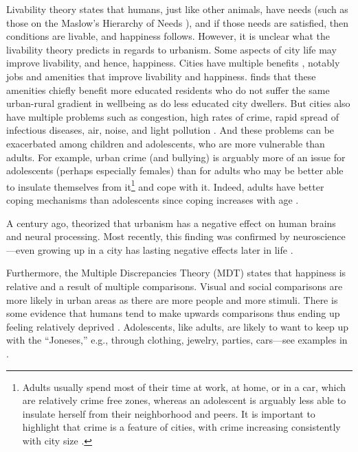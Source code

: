 \documentclass[10pt, letterpaper]{article}
\begin{document}
\begin{spacing}{1.4}
Livability theory \citep{veenhoven95,veenhoven14b,veenhoven00b} states that humans, just like other animals, have needs (such as those on the Maslow's Hierarchy of Needs \citep{maslow87}), and if those needs are satisfied, then conditions are livable, and happiness follows. 
However, it is unclear what the livability theory predicts in regards to urbanism. Some aspects of city life may improve livability, and hence, happiness. Cities have multiple benefits  \citep{meyer13,florida08,glaeser11,osullivan09}, notably jobs and amenities that improve livability and
happiness. \citet{morrison2024resolving}  finds that these amenities chiefly
benefit more educated residents who do not suffer the same urban-rural gradient
in wellbeing as do less educated city dwellers. But cities also  have multiple problems such as congestion, high
 rates of crime, rapid spread of infectious diseases, air, noise, and light
 pollution 
   \citep{bettencourt10b,bettencourt07,meyer13,aokCityBook15,aok21}.
And these problems can be  exacerbated among children and adolescents, who are
more vulnerable than adults. For example, urban crime (and bullying) is arguably
more of an issue for adolescents (perhaps especially females) than for adults
who may be better able to insulate themselves from it\footnote{Adults usually
  spend most of their  time at work, at home, or in a car, which are relatively
  crime free zones, whereas an adolescent is arguably less able to insulate
  herself from their neighborhood and peers. It is important to highlight that
  crime is a feature of cities, with crime increasing consistently with city size \citep{blissCL_nov4_14,bettencourt13,bettencourt10,bettencourt10b,bettencourt07}.}
 and cope with it. Indeed,  adults have better coping mechanisms than adolescents since coping increases with age \citep{leipold2019coping}. 

A century ago, \cite{simmel03} theorized that urbanism has a negative effect on human brains and neural processing. Most recently, this finding was confirmed by neuroscience---even growing up in a city has lasting negative effects later in life \citep{lederbogen11}. 
   
Furthermore, the Multiple Discrepancies Theory (MDT)
\citep{michalos85,michalos14c} states that happiness is relative and a result of
multiple comparisons. Visual and social comparisons are more likely in urban
areas as there are more people and more stimuli. There is some evidence that
humans tend to make upwards comparisons \citep{frey02s} thus ending up feeling
relatively deprived \citep[e.g.,][]{luttmer05,frank12}. Adolescents, like
adults, are likely to want to keep up with the ``Joneses,''  e.g., through clothing, jewelry, parties, cars---see examples in \citet{frank12}. 
 

\end{spacing}
\end{document}
